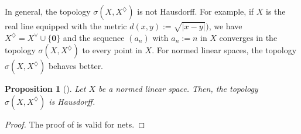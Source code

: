 \documentclass[11pt]{amsart}
\newtheorem{proposition}[theorem]{Proposition}
\theoremstyle{definition}
\numberwithin{equation}{section}
\newcommand{\abs}[1]{\lvert#1\rvert} %
\numberwithin{equation}{section}
\begin{document}
In general, the topology $\sigma(X,X^\diamondsuit)$ is not 
Hausdorff. For example, if $X$ is the real line equipped
with the metric $d(x,y):=\sqrt{\abs{x-y}})$, we have
$X^\diamondsuit = X^\vee \cup\{\mathbf{0}\}$ and the 
sequence $(a_n)$ with $a_n:=n$ in $X$ converges
in the topology $\sigma(X,X^\diamondsuit)$ to every 
point in $X$.
For normed linear spaces, the topology $\sigma(X,X^\diamondsuit)$
behaves better.

\begin{proposition}[{\cite[Theorem~1.2]{GNweakconv}}]
Let $X$ be a normed linear space. Then, the 
topology $\sigma(X,X^\diamondsuit)$ is Hausdorff.  
\end{proposition}
\begin{proof}
The proof of \cite[Theorem~1.2]{GNweakconv} is valid for nets.    
\end{proof}
  


\end{document}
